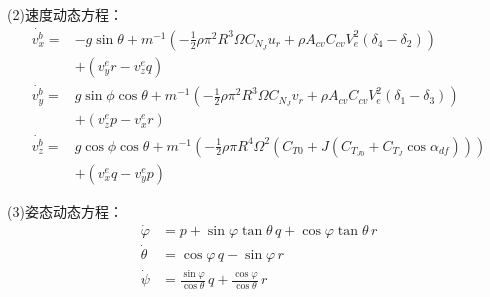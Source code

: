 (2)速度动态方程：
\begin{equation}
    \begin{aligned}
        \dot{v_x^b} =& -g\sin\theta + m^{-1}(-\frac{1}{2}\rho \pi^2 R^3 \Omega C_{N_J} u_r + \rho A_{cv} C_{cv} V_e^2 (\delta_4 - \delta_2)) \\
        &+ (v_y^e r - v_z^e q)\\
        \dot{v_y^b} =& g\sin\phi\cos\theta + m^{-1}(-\frac{1}{2}\rho \pi^2 R^3 \Omega C_{N_J} v_r + \rho A_{cv} C_{cv} V_e^2 (\delta_1 - \delta_3)) \\
        &+ (v_z^e p - v_x^e r)\\
        \dot{v_z^b} =& g\cos\phi\cos\theta + m^{-1}(-\frac{1}{2}\rho \pi R^4 \Omega^2 (C_{T0} + J (C_{T_{J0}} + C_{T_J} \cos\alpha_{df}))) \\
        &+ (v_x^e q - v_y^e p)
    \end{aligned}
    \label{eq:v_dynamic}
\end{equation}

(3)姿态动态方程：
\begin{equation}
    \begin{aligned}
        \dot{\varphi} &= p + \sin\varphi \tan\theta \, q + \cos\varphi \tan\theta \, r \\
        \dot{\theta}  &= \cos\varphi \, q - \sin\varphi \, r \\
        \dot{\psi}    &= \frac{\sin\varphi}{\cos\theta} \, q + \frac{\cos\varphi}{\cos\theta} \, r
    \end{aligned}
    \label{eq:eta_dynamic}
\end{equation}

